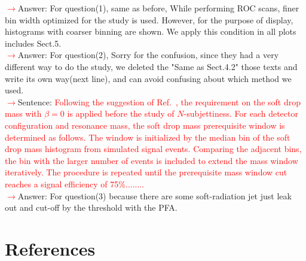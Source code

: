\documentclass[final,1p,11pt]{elsarticle}
\begin{document}
\begin{itemize}
 \textcolor{red}{$\rightarrow$}Answer: For question(1), same as before, While performing ROC scans, finer bin width optimized for the study is used. However, for the purpose of display, histograms with coarser binning are shown. We apply this condition in all plots includes Sect.5.\\
 \textcolor{red}{$\rightarrow$}Answer: For question(2), Sorry for the confusion, since they had a very different way to do the study, we deleted the "Same as Sect.4.2" those texts and write its own way(next line), and can avoid confusing about which method we used.\\
 \textcolor{red}{$\rightarrow$}Sentence: \textcolor{red}{Following the suggestion of Ref.~\cite{Dreyer:2018tjj}, the requirement on the 
soft drop mass with $\beta=0$ is applied before the study of $N$-subjettiness. 
For each detector configuration and resonance mass, the soft drop mass prerequisite window is determined as follows. The window is initialized by the median bin of the soft drop mass histogram from simulated signal events. Comparing the adjacent bins, the bin with the larger number of events is included to extend the mass window iteratively. The procedure is repeated until the prerequisite mass window cut reaches a signal efficiency of 75\%........} \\
 \textcolor{red}{$\rightarrow$}Answer: For question(3) because there are some soft-radiation jet just leak out and cut-off by the threshold with the PFA.\\ 
\end{itemize}

\section*{References}


\def\bibname{\Large\bf References}
\def\refname{\Large\bf References}
\pagestyle{plain}

\end{document}

